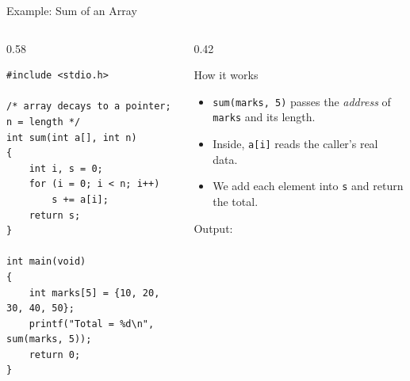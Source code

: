 \documentclass[aspectratio=169]{beamer}
\begin{document}
	\begin{frame}[fragile]{Example: Sum of an Array}
		\begin{columns}[T]
			\begin{column}{0.58\textwidth}
				\begin{lstlisting}
#include <stdio.h>

/* array decays to a pointer; n = length */
int sum(int a[], int n)
{
    int i, s = 0;
    for (i = 0; i < n; i++)
        s += a[i];
    return s;
}

int main(void)
{
    int marks[5] = {10, 20, 30, 40, 50};
    printf("Total = %d\n", sum(marks, 5));
    return 0;
}
				\end{lstlisting}
			\end{column}
			\begin{column}{0.42\textwidth}
				\begin{block}{How it works}
					\small
					\begin{itemize}
						\item \texttt{sum(marks, 5)} passes the \emph{address} of \texttt{marks} and its length.
						\item Inside, \texttt{a[i]} reads the caller's real data.
						\item We add each element into \texttt{s} and return the total.
					\end{itemize}
				\end{block}
				\centering\footnotesize Output:\; 
			\end{column}
		\end{columns}
	\end{frame}

\end{document}
